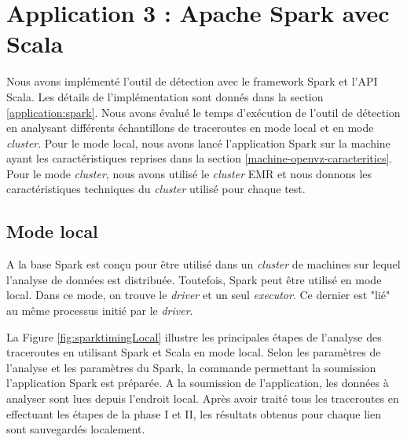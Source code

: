 \section{Application 3 : Apache Spark  avec Scala}
Nous avons implémenté l'outil de détection avec le framework Spark et l'API Scala. Les détails de l'implémentation sont donnés dans la section \ref{application:spark}.  Nous avons évalué le temps d'exécution de l'outil de détection en analysant différents échantillons de traceroutes  en mode local et en mode \textit{cluster}. Pour le mode local, nous avons lancé l'application Spark sur la machine ayant les caractéristiques  reprises dans la section \ref{machine-openvz-caracteritics}. Pour le mode \textit{cluster}, nous avons utilisé le \textit{cluster} EMR et nous donnons les caractéristiques techniques du \textit{cluster} utilisé pour chaque test.


\subsection{Mode local}

A la base Spark est conçu pour être utilisé dans un \textit{cluster} de machines sur  lequel l'analyse de données est distribuée. Toutefois, Spark peut être utilisé en mode local. Dans ce mode, on trouve le \textit{driver} et un seul \textit{executor}. Ce dernier est "lié" au même processus initié par le \textit{driver}. 



La Figure \ref{fig:sparktimingLocal} illustre les principales étapes de l'analyse des traceroutes en utilisant Spark et Scala en mode local. Selon les paramètres de l'analyse et les paramètres du Spark, la commande permettant la soumission l'application Spark est préparée. A la soumission de l'application, les données à analyser sont lues depuis l'endroit local. Après avoir traité tous les traceroutes en effectuant les étapes de la phase I et II, les résultats obtenus pour chaque lien sont sauvegardés localement. 

